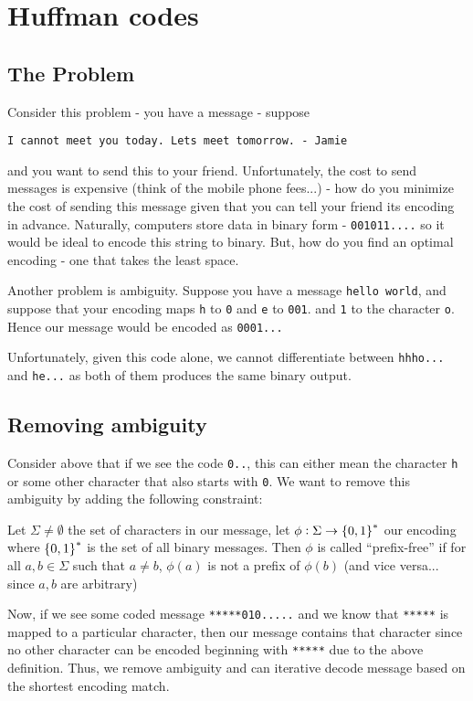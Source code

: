 \section{Huffman codes}

\subsection{The Problem}

Consider this problem - you have a message - suppose 

\begin{center}
\texttt{I cannot meet you today. Lets meet tomorrow. - Jamie}
\end{center}

and you want to send this to your friend. 
Unfortunately, the cost to send messages is expensive (think of the mobile phone fees...) - how do you minimize the cost of sending this message given that you can tell your friend its encoding in advance.
Naturally, computers store data in binary form - \texttt{001011....} so it would be ideal to encode this string to binary. But, how do you find an optimal encoding - one that takes the least space.

Another problem is ambiguity. Suppose you have a message \texttt{hello world}, and suppose that your encoding maps \texttt{h} to \texttt{0} and \texttt{e} to \texttt{001}. and \texttt{1} to the character \texttt{o}. 
Hence our message would be encoded as 
\texttt{0001...}

Unfortunately, given this code alone, we cannot differentiate between \texttt{hhho...} and \texttt{he...} as both of them produces the same binary output. 

\subsection{Removing ambiguity}

Consider above that if we see the code \texttt{0..}, this can either mean the character \texttt{h} or some other character that also starts with \texttt{0}. We want to remove this ambiguity by adding the following constraint:

\begin{define}
    Let $\Sigma \neq \emptyset$ the set of characters in our message, let $\phi: \Sigma \to \cbr{0, 1}^*$ our encoding where $\cbr{0, 1}^*$ is the set of all binary messages. 
    Then $\phi$ is called ``prefix-free'' if for all $a, b \in \Sigma$ such that $a \neq b$, $\phi(a)$ is not a prefix of $\phi(b)$ (and vice versa... since $a, b$ are arbitrary)
\end{define}

Now, if we see some coded message \texttt{*****010.....} and we know that \texttt{*****} is mapped to a particular character, then our message contains that character since no other character can be encoded beginning with \texttt{*****} due to the above definition. Thus, we remove ambiguity and can iterative decode message based on the shortest encoding match. 

